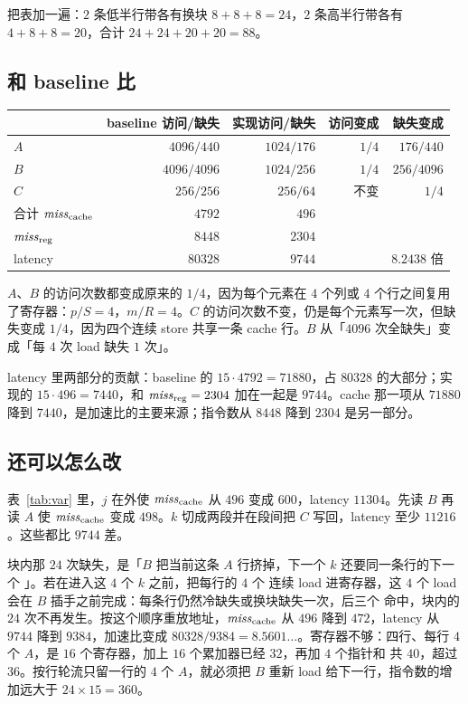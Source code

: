把表加一遍：$2$ 条低半行带各有换块 $8+8+8=24$，$2$ 条高半行带各有 $4+8+8=20$，合计 $24+24+20+20=88$。

\subsection{和 baseline 比}

\begin{center}
\small
\begin{tabular}{@{}lrrrr@{}}
\toprule
 & baseline 访问/缺失 & 实现访问/缺失 & 访问变成 & 缺失变成\\
\midrule
$A$ & $4096/440$ & $1024/176$ & $1/4$ & $176/440$\\
$B$ & $4096/4096$ & $1024/256$ & $1/4$ & $256/4096$\\
$C$ & $256/256$ & $256/64$ & 不变 & $1/4$\\
合计 $\mathit{miss}_{\mathrm{cache}}$ & $4792$ & $496$ &  & \\
$\mathit{miss}_{\mathrm{reg}}$ & $8448$ & $2304$ &  & \\
latency & $80328$ & $9744$ &  & $8.2438$ 倍\\
\bottomrule
\end{tabular}
\end{center}

$A$、$B$ 的访问次数都变成原来的 $1/4$，因为每个元素在 $4$ 个列或 $4$ 个行之间复用了寄存器：$p/S=4$，$m/R=4$。$C$ 的访问次数不变，仍是每个元素写一次，但缺失变成 $1/4$，因为四个连续 store 共享一条 cache 行。$B$ 从「$4096$ 次全缺失」变成「每 $4$ 次 load 缺失 $1$ 次」。

latency 里两部分的贡献：baseline 的 $15\cdot4792=71880$，占 $80328$ 的大部分；实现的 $15\cdot496=7440$，和 $\mathit{miss}_{\mathrm{reg}}=2304$ 加在一起是 $9744$。cache 那一项从 $71880$ 降到 $7440$，是加速比的主要来源；指令数从 $8448$ 降到 $2304$ 是另一部分。

\subsection{还可以怎么改}
\label{sec:c1more}

表~\ref{tab:var} 里，$j$ 在外使 $\mathit{miss}_{\mathrm{cache}}$ 从 $496$ 变成 $600$，latency $11304$。先读 $B$ 再读 $A$ 使 $\mathit{miss}_{\mathrm{cache}}$ 变成 $498$。$k$ 切成两段并在段间把 $C$ 写回，latency 至少 $11216$。这些都比 $9744$ 差。

块内那 $24$ 次缺失，是「$B$ 把当前这条 $A$ 行挤掉，下一个 $k$ 还要同一条行的下一个 」。若在进入这 $4$ 个 $k$ 之前，把每行的 $4$ 个  连续 load 进寄存器，这 $4$ 个 load 会在 $B$ 插手之前完成：每条行仍然冷缺失或换块缺失一次，后三个  命中，块内的 $24$ 次不再发生。按这个顺序重放地址，$\mathit{miss}_{\mathrm{cache}}$ 从 $496$ 降到 $472$，latency 从 $9744$ 降到 $9384$，加速比变成 $80328/9384=8.5601\ldots$。寄存器不够：四行、每行 $4$ 个 $A$，是 $16$ 个寄存器，加上 $16$ 个累加器已经 $32$，再加 $4$ 个指针和  共 $40$，超过 $36$。按行轮流只留一行的 $4$ 个 $A$，就必须把 $B$ 重新 load 给下一行，指令数的增加远大于 $24\times15=360$。

